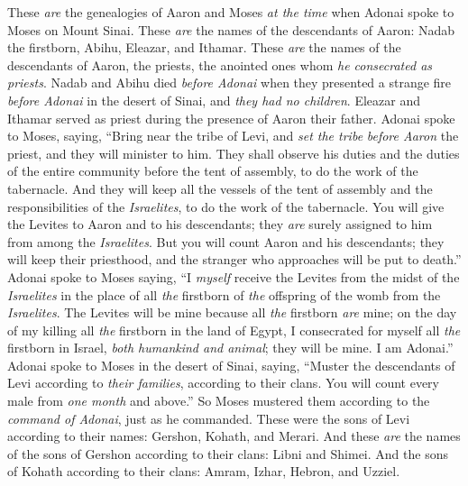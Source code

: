 \begin{biblechapter} %
 These \textit{are} the genealogies of Aaron and Moses \textit{at the time} when Adonai spoke to Moses on Mount Sinai.
\verse These \textit{are} the names of the descendants of Aaron: Nadab the firstborn, Abihu, Eleazar, and Ithamar.
\verse These \textit{are} the names of the descendants of Aaron, the priests, the anointed ones whom \textit{he consecrated as priests}.
\verse Nadab and Abihu died \textit{before Adonai} when they presented a strange fire \textit{before Adonai} in the desert of Sinai, and \textit{they had no children}. Eleazar and Ithamar served as priest during the presence of Aaron their father.
\verse Adonai spoke to Moses, saying,
\verse “Bring near the tribe of Levi, and \textit{set the tribe} \textit{before Aaron} the priest, and they will minister to him.
\verse They shall observe his duties and the duties of the entire community before the tent of assembly, to do the work of the tabernacle.
\verse And they will keep all the vessels of the tent of assembly and the responsibilities of the \textit{Israelites}, to do the work of the tabernacle.
\verse You will give the Levites to Aaron and to his descendants; they \textit{are} surely assigned to him from among the \textit{Israelites}.
\verse But you will count Aaron and his descendants; they will keep their priesthood, and the stranger who approaches will be put to death.”
\verse Adonai spoke to Moses saying,
\verse “I \textit{myself} receive the Levites from the midst of the \textit{Israelites} in the place of all \textit{the} firstborn of \textit{the} offspring of the womb from the \textit{Israelites}. The Levites will be mine
\verse because all \textit{the} firstborn \textit{are} mine; on the day of my killing all \textit{the} firstborn in the land of Egypt, I consecrated for myself all \textit{the} firstborn in Israel, \textit{both humankind and animal}; they will be mine. I am Adonai.”
\verse Adonai spoke to Moses in the desert of Sinai, saying,
\verse “Muster the descendants of Levi according to \textit{their families}, according to their clans. You will count every male from \textit{one month} and above.”
\verse So Moses mustered them according to the \textit{command of Adonai}, just as he commanded.
\verse These were the sons of Levi according to their names: Gershon, Kohath, and Merari.
\verse And these \textit{are} the names of the sons of Gershon according to their clans: Libni and Shimei.
\verse And the sons of Kohath according to their clans: Amram, Izhar, Hebron, and Uzziel.

\end{biblechapter}
